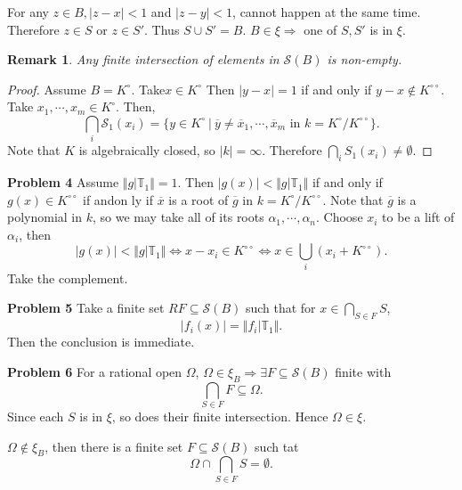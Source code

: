 \documentclass[10pt]{article}
\newtheorem{remark}{Remark}[section]
\newcommand{\norm}[1]{\Vert #1 \Vert}
\newcommand{\T}[0]{\mathbb{T}}
\newcommand{\sep}[0]{\:|\:}
\newcommand{\ab}[1]{\vert #1 \vert}
\begin{document}
For any $z\in B,\ab{z-x}<1$ and $\ab{z-y}<1$, cannot happen at the same time. Therefore $z\in S$ or $z\in S'$. Thus $S\cup S'=B$. $B\in\xi\Rightarrow$ one of $S,S'$ is in $\xi$. 
\begin{remark}
    Any finite intersection of elements in $\mathcal{S}(B)$ is non-empty.
\end{remark}
\begin{proof}
    Assume $B=K^\circ$. Take$ x\in K^\circ$ Then $\ab{y-x}=1$ if and only if $y-x\not\in K^{\circ\circ}$. Take $x_1,\cdots,x_m\in K^\circ$. Then,
    \begin{equation*}
        \bigcap_{i}\mathcal{S}_1(x_i) = \{y\in K^\circ\sep \overline{y} \not=\overline{x}_1,\cdots,\overline{x}_m\text{ in }k = K^\circ/K^{\circ\circ}\}.
    \end{equation*}
    Note that $K$ is algebraically closed, so $\ab{k} = \infty$. Therefore $\bigcap_i S_1(x_i) \not=\emptyset$.
\end{proof}
\par\textbf{Problem 4}
Assume $\norm{g|\T_1} = 1$. Then $\ab{g(x)}<\norm{g|\T_1}$ if and only if $g(x)\in K^{\circ\circ}$ if andon ly if $\overline{x}$ is a root of $\overline{g}$ in $k = K^\circ/K^{\circ\circ}$. Note that $\overline{g}$ is a polynomial in $k$, so we may take all of its roots $\alpha_1,\cdots,\alpha_n$. Choose $x_i$ to be a lift of $\alpha_i$, then 
\begin{equation*}
    \ab{g(x)}<\norm{g|\T_1}\iff x-x_i\in K^{\circ\circ}\iff x\in\bigcup_i(x_i+K^{\circ\circ}).
\end{equation*}
Take the complement.
\par\textbf{Problem 5}
Take a finite set $RF\subseteq\mathcal{S}(B)$ such that for $x\in\bigcap_{S\in F}S$,
\begin{equation*}
    \ab{f_i(x)}=\norm{f_i|\T_1}.
\end{equation*}
Then the conclusion is immediate.
\par\textbf{Problem 6}
For a rational open $\Omega$, $\Omega\in\xi_B\Rightarrow \exists F\subseteq \mathcal{S}(B)$ finite with 
\begin{equation*}
    \bigcap_{S\in F}F\subseteq\Omega.
\end{equation*}
Since each $S$ is in $\xi$, so does their finite intersection. Hence $\Omega\in\xi$. 
\par $\Omega\not\in\xi_B$, then there is a finite set $F\subseteq\mathcal{S}(B)$ such tat 
\begin{equation*}
    \Omega\cap\bigcap_{S\in F}S = \emptyset. 
\end{equation*}
\end{document}
